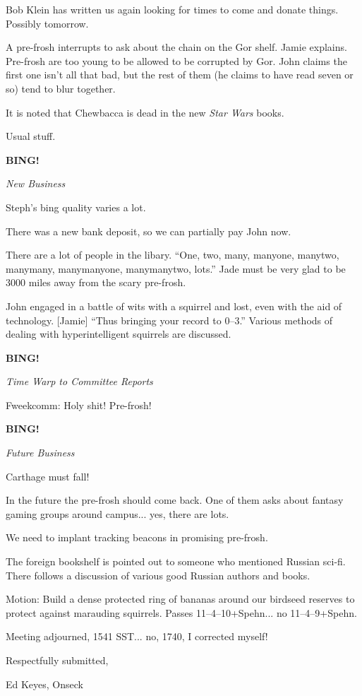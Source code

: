 \documentclass[12pt]{article}
\newcommand{\bing}{{\bf BING!} }
\newcommand{\goto}[1]{\bing \vskip 12pt \centerline{{\em{#1}}}}
\begin{document}
Bob Klein has written us again looking for times to come and donate
things.  Possibly tomorrow.

A pre-frosh interrupts to ask about the chain on the Gor shelf.
Jamie explains.  Pre-frosh are too young to be allowed to be corrupted
by Gor.  John claims the first one isn't all that bad, but the rest
of them (he claims to have read seven or so) tend to blur together.

It is noted that Chewbacca is dead in the new {\em Star Wars} books.

Usual stuff.

\goto{New Business}

Steph's bing quality varies a lot.

There was a new bank deposit, so we can partially pay John now.

There are a lot of people in the libary.  ``One, two, many, manyone,
manytwo, manymany, manymanyone, manymanytwo, lots.''  Jade must be very
glad to be 3000 miles away from the scary pre-frosh.

John engaged in a battle of wits with a squirrel and lost, even with
the aid of technology.  [Jamie] ``Thus bringing your record to 0--3.''
Various methods of dealing with hyperintelligent squirrels are
discussed.

\goto{Time Warp to Committee Reports}

Fweekcomm: Holy shit!  Pre-frosh!

\goto{Future Business}

Carthage must fall!

In the future the pre-frosh should come back.  One of them asks about
fantasy gaming groups around campus... yes, there are lots.

We need to implant tracking beacons in promising pre-frosh.

The foreign bookshelf is pointed out to someone who mentioned Russian
sci-fi.  There follows a discussion of various good Russian authors
and books.

Motion: Build a dense protected ring of bananas around our birdseed
reserves to protect against marauding squirrels.  Passes 11--4--10+Spehn...
no 11--4--9+Spehn.

\vspace{12pt}

\noindent
Meeting adjourned, 1541 SST... no, 1740, I corrected myself!

\vspace{18pt}

\centerline{Respectfully submitted,}
\centerline{Ed Keyes, Onseck}
\end{document}
